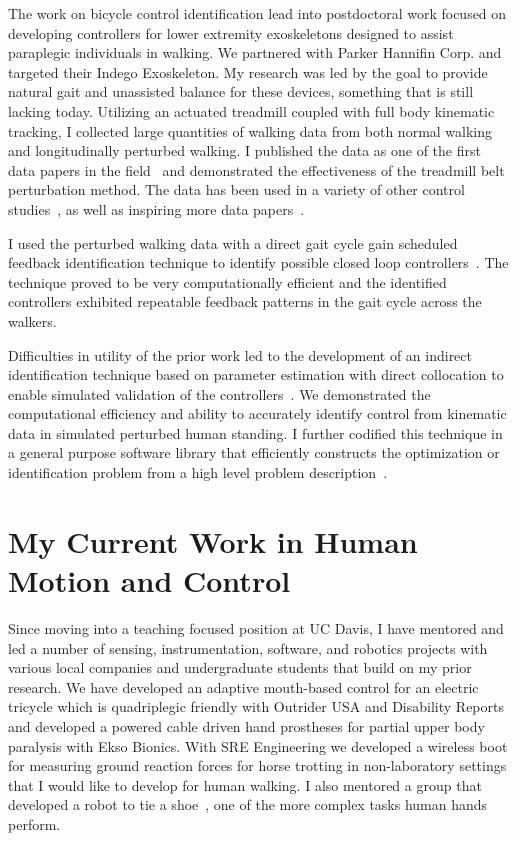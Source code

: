 \documentclass{article}
\begin{document}
The work on bicycle control identification lead into postdoctoral work focused
on developing controllers for lower extremity exoskeletons designed to assist
paraplegic individuals in walking. We partnered with Parker Hannifin Corp. and
targeted their Indego Exoskeleton. My research was led by the goal to provide
natural gait and unassisted balance for these devices, something that is still
lacking today. Utilizing an actuated treadmill coupled with full body kinematic
tracking, I collected large quantities of walking data from both normal walking
and longitudinally perturbed walking. I published the data as one of the first
data papers in the field~\cite{Moore2015b} and demonstrated the effectiveness
of the treadmill belt perturbation method. The data has been used in a variety
of other control studies~\cite{Rohani2017,Thatte2018,Vimal2019}, as well as
inspiring more data papers~\cite{Santos2016,Fukuchi2017,Fukuchi2018,Santuz2018}.

I used the perturbed walking data with a direct gait cycle gain scheduled
feedback identification technique to identify possible closed loop
controllers~\cite{Moore2013c,Moore2014a,Moore2014c}. The technique proved to be
very computationally efficient and the identified controllers exhibited
repeatable feedback patterns in the gait cycle across the walkers.

Difficulties in utility of the prior work led to the development of an
indirect identification technique based on parameter estimation with direct
collocation to enable simulated validation of the
controllers~\cite{Moore2014e,Moore2015}.  We demonstrated the computational
efficiency and ability to accurately identify control from kinematic data in
simulated perturbed human standing. I further codified this technique in a
general purpose software library that efficiently constructs the optimization
or identification problem from a high level problem
description~\cite{Moore2014,Moore2018}.

\section*{My Current Work in Human Motion and Control}

Since moving into a teaching focused position at UC Davis, I have mentored and
led a number of sensing, instrumentation, software, and robotics projects with
various local companies and undergraduate students that build on my prior
research. We have developed an adaptive mouth-based control for an electric
tricycle which is quadriplegic friendly with Outrider USA and Disability
Reports and developed a powered cable driven hand prostheses for partial upper
body paralysis with Ekso Bionics. With SRE Engineering we developed a wireless
boot for measuring ground reaction forces for horse trotting in non-laboratory
settings that I would like to develop for human walking. I also mentored a
group that developed a robot to tie a shoe~\cite{Choi2018}, one of the more
complex tasks human hands perform.
\end{document}
